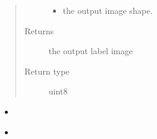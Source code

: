 \documentclass[letterpaper,10pt,english]{sphinxmanual}
\begin{document}
\begin{fulllineitems}
\begin{quote}
\begin{description}
\begin{itemize}
\item {} 
 \textendash{} the output image shape.

\end{itemize}

\item[{Returns}] \leavevmode
the output label image

\item[{Return type}] \leavevmode
uint8

\end{description}\end{quote}



\begin{itemize}
\item {} 
{\hyperref[\detokenize{index:util.read_oct_roi_file.boundary_mask}]{}}

\item {} 
{\hyperref[\detokenize{index:util.read_oct_roi_file.roi_file_parser}]{}}

\end{itemize}



\end{fulllineitems}

\end{document}
